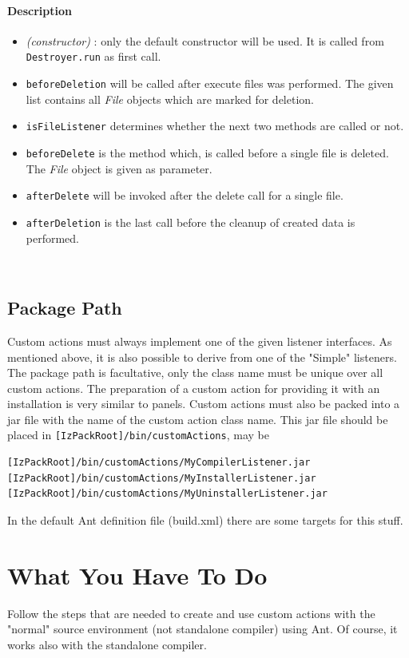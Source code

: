 \paragraph{Description}

\begin{itemize}

  \item \textit{(constructor)} : only the default constructor will
  be used. It is called from \texttt{Destroyer.run} as first call.
  \item \texttt{beforeDeletion} will be called after execute files was performed.
  The given list contains all \emph{File} objects which are marked for deletion.
  \item \texttt{isFileListener} determines whether the next two
  methods are called or not.
  \item \texttt{beforeDelete} is the method which, is called before
  a single file is deleted. The \emph{File} object is given as
  parameter.
  \item \texttt{afterDelete} will be invoked after the delete call
  for a single file.
  \item \texttt{afterDeletion} is the last call before the
  cleanup of created data is performed.
\end{itemize}\

\subsection{Package Path}
Custom actions must always implement one of the given listener
interfaces. As mentioned above, it is also possible to derive from
one of the "Simple" listeners. The package path is facultative, only the
class name must be unique over all custom actions. The preparation of a
custom action for providing it with an installation is very similar to panels.
Custom actions must also be packed into a jar file with the name
of the custom action class name. This jar file should be placed in
\texttt{[IzPackRoot]/bin/customActions}, may be
\begin{verbatim}
[IzPackRoot]/bin/customActions/MyCompilerListener.jar
[IzPackRoot]/bin/customActions/MyInstallerListener.jar
[IzPackRoot]/bin/customActions/MyUninstallerListener.jar
\end{verbatim}
In the default Ant definition file (build.xml) there are some
targets for this stuff.


\section{What You Have To Do}
Follow the steps that are needed to create and use custom actions
with the "normal" source environment (not standalone compiler)
using Ant. Of course, it works also with the standalone compiler.

